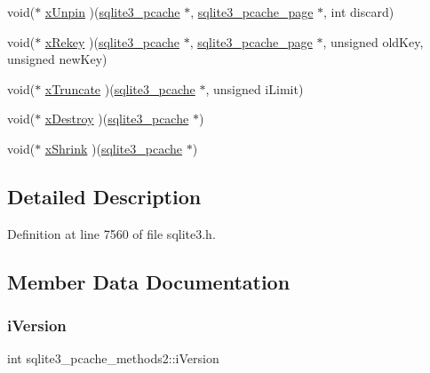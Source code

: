 \begin{DoxyCompactItemize}
void($\ast$ \mbox{\hyperlink{structsqlite3__pcache__methods2_a8fcb4ba48106aac8dfff247baea06e1a}{x\+Unpin}} )(\mbox{\hyperlink{sqlite3_8h_a096c453d937d51f7926d7d31c8e0bd2f}{sqlite3\+\_\+pcache}} $\ast$, \mbox{\hyperlink{structsqlite3__pcache__page}{sqlite3\+\_\+pcache\+\_\+page}} $\ast$, int discard)
\item 
void($\ast$ \mbox{\hyperlink{structsqlite3__pcache__methods2_ad5b7609bdc0d2ae80325f7925b76c0af}{x\+Rekey}} )(\mbox{\hyperlink{sqlite3_8h_a096c453d937d51f7926d7d31c8e0bd2f}{sqlite3\+\_\+pcache}} $\ast$, \mbox{\hyperlink{structsqlite3__pcache__page}{sqlite3\+\_\+pcache\+\_\+page}} $\ast$, unsigned old\+Key, unsigned new\+Key)
\item 
void($\ast$ \mbox{\hyperlink{structsqlite3__pcache__methods2_a711d60b1895622a10186a2894cef1383}{x\+Truncate}} )(\mbox{\hyperlink{sqlite3_8h_a096c453d937d51f7926d7d31c8e0bd2f}{sqlite3\+\_\+pcache}} $\ast$, unsigned i\+Limit)
\item 
void($\ast$ \mbox{\hyperlink{structsqlite3__pcache__methods2_a17a43db31d015c29e44d68c752682365}{x\+Destroy}} )(\mbox{\hyperlink{sqlite3_8h_a096c453d937d51f7926d7d31c8e0bd2f}{sqlite3\+\_\+pcache}} $\ast$)
\item 
void($\ast$ \mbox{\hyperlink{structsqlite3__pcache__methods2_a225971a193ff429d9f1339aca39c7755}{x\+Shrink}} )(\mbox{\hyperlink{sqlite3_8h_a096c453d937d51f7926d7d31c8e0bd2f}{sqlite3\+\_\+pcache}} $\ast$)
\end{DoxyCompactItemize}


\subsection{Detailed Description}


Definition at line 7560 of file sqlite3.\+h.



\subsection{Member Data Documentation}
\mbox{\label{structsqlite3__pcache__methods2_a03b27be6c7cb8f1d2662c454cbe58483}} 
\subsubsection{\texorpdfstring{i\+Version}{iVersion}}
{\footnotesize\ttfamily int sqlite3\+\_\+pcache\+\_\+methods2\+::i\+Version}



